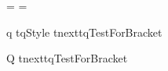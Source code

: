 %


=\undefined
{}=\undefined


\NewFormatKey q%
  {\!tqStyle
   \futurelet\!tnext\!tqTestForBracket}


\NewFormatKey Q%
  {\def\!tqStyle{$}%
   \futurelet\!tnext\!tqTestForBracket}

